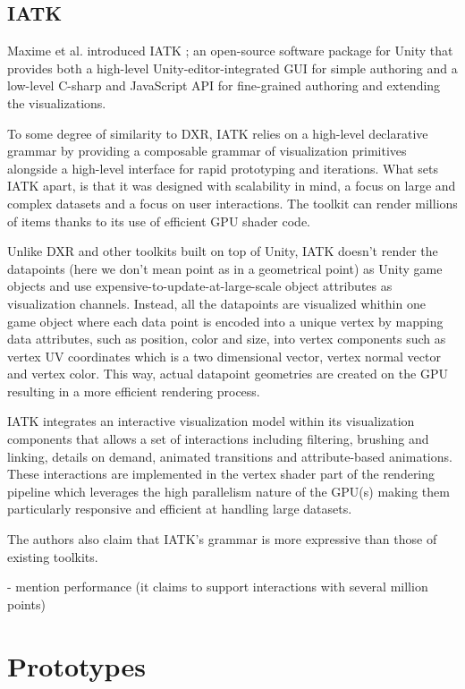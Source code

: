 \documentclass{vgtc}                          %
\begin{document}
\subsection{IATK}
Maxime et al. introduced IATK \cite{iatk_toolkit}; an open-source software
package for Unity that provides both a high-level Unity-editor-integrated GUI
for simple authoring and a low-level C-sharp and JavaScript API for
fine-grained authoring and extending the visualizations.

To some degree of similarity to DXR, IATK relies on a high-level declarative
grammar by providing a composable grammar of visualization primitives alongside
a high-level interface for rapid prototyping and iterations. What sets IATK
apart, is that it was designed with scalability in mind, a focus on large
and complex datasets and a focus on user interactions. The toolkit can render
millions of items thanks to its use of efficient GPU shader code.

Unlike DXR and other toolkits built on top of Unity, IATK doesn't render
the datapoints (here we don't mean point as in a geometrical point) as Unity
game objects and use expensive-to-update-at-large-scale object attributes as
visualization channels. Instead, all the datapoints are visualized whithin one
game object where each data point is encoded into a unique vertex by mapping
data attributes, such as position, color and size, into vertex components such
as vertex UV coordinates which is a two dimensional vector, vertex normal vector
and vertex color. This way, actual datapoint geometries are created on the GPU
resulting in a more efficient rendering process.

IATK integrates an interactive visualization model within its visualization
components that allows a set of interactions including filtering, brushing and
linking, details on demand, animated transitions and attribute-based animations.
These interactions are implemented in the vertex shader part of the rendering
pipeline which leverages the high parallelism nature of the GPU(s) making them
particularly responsive and efficient at handling large datasets.

The authors also claim that IATK's grammar is more expressive
than those of existing toolkits.


- mention performance (it claims to support interactions with several million
points)

\section{Prototypes}
\end{document}
